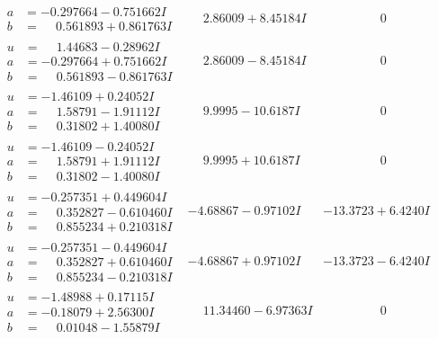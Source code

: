 \documentclass[1p]{elsarticle_modified}
\theoremstyle{definition}
\begin{document}
$$\begin{array}{c|c|c}
\begin{aligned}
a &= -0.297664 - 0.751662 I \\
b &= \phantom{-}0.561893 + 0.861763 I\end{aligned}
 & \phantom{-}2.86009 + 8.45184 I & \phantom{-0.000000 } 0 \\ \hline\begin{aligned}
u &= \phantom{-}1.44683 - 0.28962 I \\
a &= -0.297664 + 0.751662 I \\
b &= \phantom{-}0.561893 - 0.861763 I\end{aligned}
 & \phantom{-}2.86009 - 8.45184 I & \phantom{-0.000000 } 0 \\ \hline\begin{aligned}
u &= -1.46109 + 0.24052 I \\
a &= \phantom{-}1.58791 - 1.91112 I \\
b &= \phantom{-}0.31802 + 1.40080 I\end{aligned}
 & \phantom{-}9.9995 - 10.6187 I & \phantom{-0.000000 } 0 \\ \hline\begin{aligned}
u &= -1.46109 - 0.24052 I \\
a &= \phantom{-}1.58791 + 1.91112 I \\
b &= \phantom{-}0.31802 - 1.40080 I\end{aligned}
 & \phantom{-}9.9995 + 10.6187 I & \phantom{-0.000000 } 0 \\ \hline\begin{aligned}
u &= -0.257351 + 0.449604 I \\
a &= \phantom{-}0.352827 - 0.610460 I \\
b &= \phantom{-}0.855234 + 0.210318 I\end{aligned}
 & -4.68867 - 0.97102 I & -13.3723 + 6.4240 I \\ \hline\begin{aligned}
u &= -0.257351 - 0.449604 I \\
a &= \phantom{-}0.352827 + 0.610460 I \\
b &= \phantom{-}0.855234 - 0.210318 I\end{aligned}
 & -4.68867 + 0.97102 I & -13.3723 - 6.4240 I \\ \hline\begin{aligned}
u &= -1.48988 + 0.17115 I \\
a &= -0.18079 + 2.56300 I \\
b &= \phantom{-}0.01048 - 1.55879 I\end{aligned}
 & \phantom{-}11.34460 - 6.97363 I & \phantom{-0.000000 } 0 \\ \hline\begin{aligned}

\end{aligned}
\end{array}$$
\end{document}
